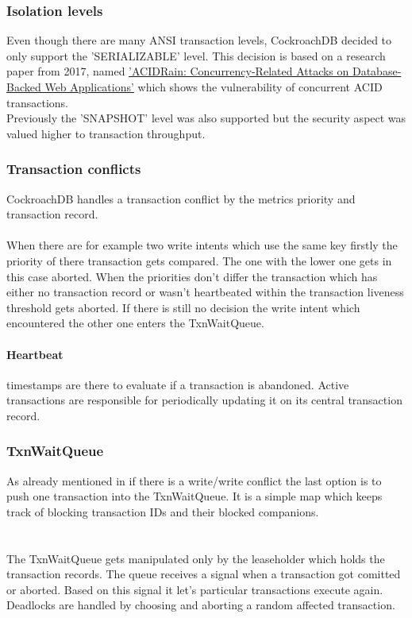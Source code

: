 \subsubsection{Isolation levels}
Even though there are many ANSI transaction levels, CockroachDB decided to only support the 'SERIALIZABLE' level.
This decision is based on a research paper from 2017, named \href{http://www.bailis.org/papers/acidrain-sigmod2017.pdf}
{'ACIDRain: Concurrency-Related Attacks on Database-Backed Web Applications'} which shows the vulnerability of concurrent 
ACID transactions.\\
Previously the 'SNAPSHOT' level was also supported but the security aspect was valued higher to transaction throughput.

\subsubsection{Transaction conflicts}
\label{sec:transactionconflicts}
CockroachDB handles a transaction conflict by the metrics priority and transaction record.\\\\
When there are for example two write intents which use the same key firstly the priority of there transaction gets compared.
The one with the lower one gets in this case aborted. When the priorities don't differ the transaction which has either no
transaction record or wasn't heartbeated within the transaction liveness threshold gets aborted. If there is still no
decision the write intent which encountered the other one enters the TxnWaitQueue.

\paragraph{Heartbeat} timestamps are there to evaluate if a transaction is abandoned. Active transactions are 
responsible for periodically updating it on its central transaction record. 

\subsubsection{TxnWaitQueue}
As already mentioned in  if there is a write/write conflict the last option is to push one
transaction into the TxnWaitQueue. It is a simple map which keeps track of blocking transaction IDs and their blocked 
companions.\\
\\
\\The TxnWaitQueue gets manipulated only by the leaseholder which holds the transaction 
records. The queue receives a signal when a transaction got comitted or aborted. Based on this signal it let's particular
transactions execute again.\\
Deadlocks are handled by choosing and aborting a random affected transaction.


